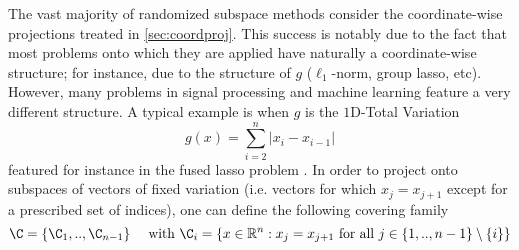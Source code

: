 The vast majority of randomized subspace methods consider the coordinate-wise projections treated in \ref{sec:coordproj}. This success is notably due to the fact that most problems onto which they are applied have naturally a coordinate-wise structure; for instance, due to the structure of $g$ ($\ell_1$-norm, group lasso, etc). However, many problems in signal processing and machine learning feature a very different structure. A typical example is when $g$ is the $1$D-Total Variation 
\begin{equation}\label{eq:TV}
    g(x) = \sum_{i=2}^n |x_{i}-x_{i-1}|
\end{equation}
featured for instance in the fused lasso problem \cite{tibshirani2005sparsity}. In order to project onto subspaces of vectors of fixed variation (i.e. vectors for which $x_j = x_{j+1}$ except for a prescribed set of indices), one can define the following covering family 
{
$$ \C = \{\C_1,..,\C_{n-1}\} \quad\text{ with } \C_i = \left\{x\in\mathbb{R}^n  : x_{j} = x_{j+1} \text{ for all } j\in \{1,..,n-1\}\setminus\{i\}  \right\} $$ }
